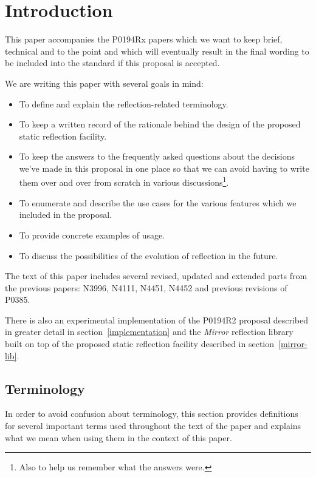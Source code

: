 \section{Introduction}

This paper accompanies the P0194Rx papers which we want to keep brief, technical
and to the point and which will eventually result in the final wording to be
included into the standard if this proposal is accepted.

We are writing this paper with several goals in mind:

\begin{itemize}
\item To define and explain the reflection-related terminology.
\item To keep a written record of the rationale behind the design of the
proposed static reflection facility.
\item To keep the answers to the frequently asked questions about
the decisions we've made in this proposal in one place so that we can avoid
having to write them over and over from scratch in various discussions\footnote
{Also to help us remember what the answers were.}.
\item To enumerate and describe the use cases for the various features
which we included in the proposal.
\item To provide concrete examples of usage.
\item To discuss the possibilities of the evolution of reflection in the future.
\end{itemize}

The text of this paper includes several revised, updated and extended parts
from the previous papers: N3996, N4111, N4451, N4452 and previous revisions
of P0385.

There is also an experimental implementation of the P0194R2 proposal
described in greater detail in section~\ref{implementation}
and the {\em Mirror} reflection library built on top of the proposed
static reflection facility described in section~\ref{mirror-lib}.

\subsection{Terminology}

In order to avoid confusion about terminology, this section provides definitions
for several important terms used throughout the text of the paper and
explains what we mean when using them in the context of this paper.

